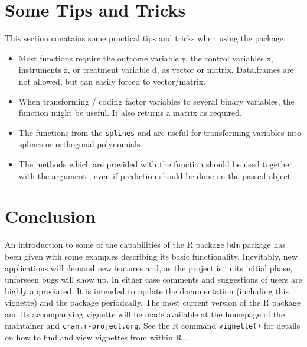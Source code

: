 \documentclass{amsart}
\newcommand{\Rpackage}[1]{{\texttt{#1}}}
\newcommand{\R}{{\normalfont\textsf{R }}{}}
\begin{document}
\section{Some Tips and Tricks}
This section conatains some practical tips and tricks when using the package.

\begin{itemize}
 \item Most functions require the outcome variable y, the control variables x, instruments z, or treatment variable d, as vector or matrix. Data.frames are not allowed, but can easily forced to vector/matrix.
 \item When transforming / coding factor variables to several binary variables, the function  might be useful. It also returns a matrix as required.
 \item The functions   from the \Rpackage{splines} and  are useful for transforming variables into splines or orthogonal polynomials.
 \item The methods  which are provided with the function should be used together with the argument , even if prediction should be done on the passed object.
\end{itemize}

\section{Conclusion}

An introduction to some of the capabilities of the \R package \texttt{hdm}
package has been given with some examples describing its basic functionality. Inevitably, new applications will
demand new features and, as the project is in its initial phase, unforseen bugs will show up. In either case comments and suggestions of users are highly appreciated. It is intended to update the documentation (including this vignette) and the package periodcally. The most current version of the \R package and its accompanying vignette will be made available at the homepage of the maintainer and \texttt{cran.r-project.org}. See the \R command \texttt{vignette()} for details on how to find
and view vignettes from within \R.



\footnotesize


\end{document}
